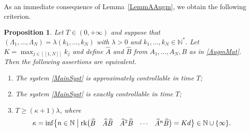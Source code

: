 \documentclass[10pt]{article}
\newcommand{\llbracket}{[\![}
\newcommand{\rrbracket}{]\!]}
\theoremstyle{plain}
\newtheorem{prop}[theo]{Proposition}
\theoremstyle{definition}
\DeclareMathOperator{\rank}{rk}
\numberwithin{equation}{section}\numberwithin{figure}{section}\emergencystretch=3em
\begin{document}
As an immediate consequence of Lemma~\ref{LemmAAugm}, we obtain the following criterion.

\begin{prop}
\label{PropCommensurable}
Let $T \in (0, +\infty)$ and suppose that $(\Lambda_1, \dots, \Lambda_N) = \lambda (k_1, \dots, k_N)$ with $\lambda > 0$ and $k_1, \dots, k_N \in \mathbb N^\ast$. Let $K = \max_{j \in \llbracket 1, N\rrbracket} k_j$ and define $\widehat A$ and $\widehat B$ from $A_1, \dots, A_N, B$ as in \eqref{AugmMat}. Then the following assertions are equivalent.
\begin{enumerate}
\item\label{CtrlCommensurableApprox} The system \eqref{MainSyst} is approximately controllable in time $T$;
\item\label{CtrlCommensurableExact} The system \eqref{MainSyst} is exactly controllable in time $T$;
\item\label{CtrlCommensurableKalman} $T \geq (\kappa+1) \lambda$, where
\[
\kappa = \inf\bigl\{n \in \mathbb N \bigm| \rank\bigl(\begin{matrix}\widehat B & \widehat A \widehat B & \widehat A^2 \widehat B & \cdots & \widehat A^n \widehat B\end{matrix}\bigr) = K d\bigr\} \in \mathbb N \cup \{\infty\}.
\]
\end{enumerate}
\end{prop}
\end{document}
